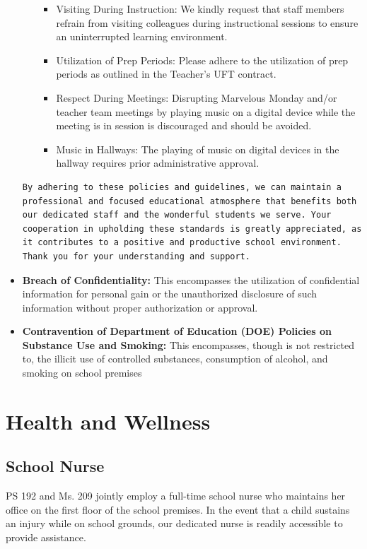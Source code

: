 \documentclass[11pt, letterpaper]{article}
\begin{document}
\begin{itemize}
\begin{itemize}
\begin{itemize}
	\item Visiting During Instruction: We kindly request that staff members refrain from visiting colleagues during instructional sessions to ensure an uninterrupted learning environment.
	\item Utilization of Prep Periods: Please adhere to the utilization of prep periods as outlined in the Teacher’s UFT contract.
	\item Respect During Meetings: Disrupting Marvelous Monday and/or teacher team meetings by playing music on a digital device while the meeting is in session is discouraged and should be avoided.
	\item Music in Hallways: The playing of music on digital devices in the hallway requires prior administrative approval.
	\end{itemize}
\end{itemize}

\begin{Verbatim}[breaklines=true, breakanywhere=true]
By adhering to these policies and guidelines, we can maintain a professional and focused educational atmosphere that benefits both our dedicated staff and the wonderful students we serve. Your cooperation in upholding these standards is greatly appreciated, as it contributes to a positive and productive school environment. Thank you for your understanding and support.
\end{Verbatim}
\item \textbf{Breach of Confidentiality:} This encompasses the utilization of confidential information for personal gain or the unauthorized disclosure of such information without proper authorization or approval.
\item \textbf{Contravention of Department of Education (DOE) Policies on Substance Use and Smoking:} This encompasses, though is not restricted to, the illicit use of controlled substances, consumption of alcohol, and smoking on school premises
\end{itemize}
\section{Health and Wellness}
\subsection{School Nurse}
PS 192 and Ms. 209 jointly employ a full-time school nurse who maintains her office on the first floor of the school premises. In the event that a child sustains an injury while on school grounds, our dedicated nurse is readily accessible to provide assistance.
\end{document}
